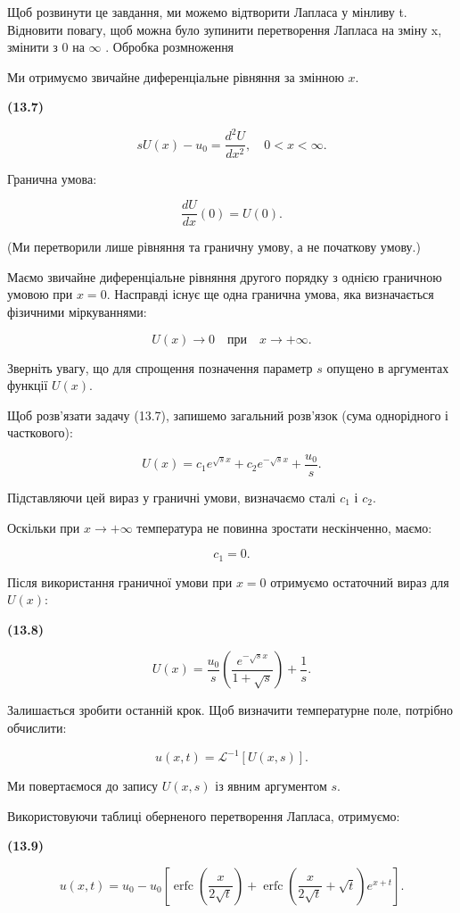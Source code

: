 Щоб розвинути це завдання, ми можемо відтворити Лапласа у мінливу t. Відновити повагу, щоб можна було зупинити перетворення Лапласа на зміну x, змінити з 0 на \(\infty\) . Обробка розмноження

Ми отримуємо звичайне диференціальне рівняння за змінною \(x\).

\textbf{(13.7)}

\[
sU(x) - u_0 = \frac{d^2U}{dx^2}, \quad 0 < x < \infty.
\]

Гранична умова:

\[
\frac{dU}{dx}(0) = U(0).
\]

(Ми перетворили лише рівняння та граничну умову, а не початкову умову.)

Маємо звичайне диференціальне рівняння другого порядку з однією граничною умовою при \(x=0\). Насправді існує ще одна гранична умова, яка визначається фізичними міркуваннями:

\[
U(x) \to 0 \quad \text{при} \quad x \to +\infty.
\]

Зверніть увагу, що для спрощення позначення параметр \(s\) опущено в аргументах функції \(U(x)\).

Щоб розв'язати задачу (13.7), запишемо загальний розв'язок (сума однорідного і часткового):

\[
U(x) = c_1 e^{\sqrt{s}x} + c_2 e^{-\sqrt{s}x} + \frac{u_0}{s}.
\]

Підставляючи цей вираз у граничні умови, визначаємо сталі \(c_1\) і \(c_2\).

Оскільки при \(x \to +\infty\) температура не повинна зростати нескінченно, маємо:

\[
c_1 = 0.
\]

Після використання граничної умови при \(x=0\) отримуємо остаточний вираз для \(U(x)\):

\textbf{(13.8)}

\[
U(x) = \frac{u_0}{s} \left( \frac{e^{-\sqrt{s}x}}{1 + \sqrt{s}} \right) + \frac{1}{s}.
\]

Залишається зробити останній крок. Щоб визначити температурне поле, потрібно обчислити:

\[
u(x, t) = \mathcal{L}^{-1}[U(x, s)].
\]

Ми повертаємося до запису \(U(x, s)\) із явним аргументом \(s\).

Використовуючи таблиці оберненого перетворення Лапласа, отримуємо:

\textbf{(13.9)}

\[
u(x, t) = u_0 - u_0 \left[ \operatorname{erfc}\!\left( \frac{x}{2\sqrt{t}} \right) + \operatorname{erfc}\!\left( \frac{x}{2\sqrt{t}} + \sqrt{t} \right) e^{x+t} \right].
\]

